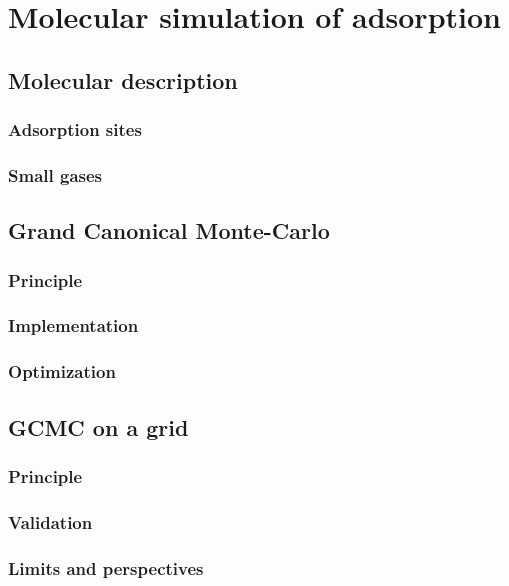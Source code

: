 \documentclass[main.tex]{subfiles}
\begin{document}
\chapter{Molecular simulation of adsorption}
\vspace*{-1\baselineskip}

\section{Molecular description}

\subsection{Adsorption sites}

\subsection{Small gases}


\section{Grand Canonical Monte-Carlo}
\label{GCMC}

\subsection{Principle}

\subsection{Implementation}

\subsection{Optimization}


\section{GCMC on a grid}

\subsection{Principle}

\subsection{Validation}

\subsection{Limits and perspectives}
\end{document}
